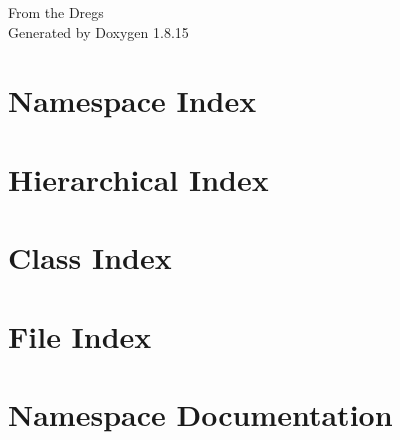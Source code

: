 \let\mypdfximage\pdfximage\def\pdfximage{\immediate\mypdfximage}\documentclass[twoside]{book}
\newcommand{\+}{\discretionary{\mbox{\scriptsize$\hookleftarrow$}}{}{}}
\newcommand{\clearemptydoublepage}{%
  \newpage{\pagestyle{empty}\cleardoublepage}%
}
\begin{document}
\hypersetup{pageanchor=false,
             bookmarksnumbered=true,
             pdfencoding=unicode
            }
\begin{titlepage}
\vspace*{7cm}
\begin{center}%
{\Large From the Dregs }\\
\vspace*{1cm}
{\large Generated by Doxygen 1.8.15}\\
\end{center}
\end{titlepage}
\clearemptydoublepage
{}
\tableofcontents
\clearemptydoublepage
{}
\hypersetup{pageanchor=true}

\chapter{Namespace Index}

\chapter{Hierarchical Index}

\chapter{Class Index}

\chapter{File Index}

\chapter{Namespace Documentation}

\end{document}
